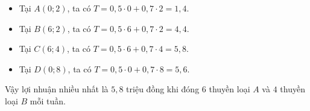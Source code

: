 \begin{ex}
{\begin{center}
		\end{center}
		\begin{itemize}
			\item Tại $A(0;2)$, ta có $T=0{,}5 \cdot 0 +0{,}7 \cdot 2=1{,}4$.
			\item Tại $B(6;2)$, ta có $T=0{,}5\cdot 6+0{,}7 \cdot 2=4{,}4$. 
			\item Tại $C(6;4)$, ta có $T=0{,}5 \cdot 6+0{,}7 \cdot 4=5{,}8$.
			\item Tại $D(0;8)$, ta có $T=0{,}5 \cdot 0 +0{,}7 \cdot 8=5{,}6$.
		\end{itemize}
		Vậy lợi nhuận nhiều nhất là $5{,}8$ triệu đồng khi đóng $6$ thuyền loại $A$ và $4$ thuyền loại $B$ mỗi tuần.
	}
\end{ex}


